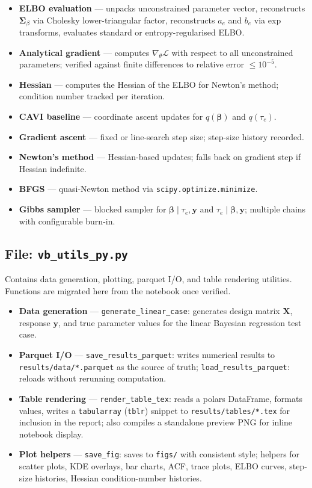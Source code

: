 \documentclass[11pt,a4paper]{article}
\begin{document}
\begin{itemize}
  \item \textbf{ELBO evaluation} — unpacks unconstrained parameter vector, reconstructs $\bm{\Sigma}_\beta$ via Cholesky lower-triangular factor, reconstructs $a_e$ and $b_e$ via exp transforms, evaluates standard or entropy-regularised ELBO.
  \item \textbf{Analytical gradient} — computes $\nabla_\theta \mathcal{L}$ with respect to all unconstrained parameters; verified against finite differences to relative error $\leq 10^{-5}$.
  \item \textbf{Hessian} — computes the Hessian of the ELBO for Newton's method; condition number tracked per iteration.
  \item \textbf{CAVI baseline} — coordinate ascent updates for $q(\bm{\beta})$ and $q(\tau_e)$.
  \item \textbf{Gradient ascent} — fixed or line-search step size; step-size history recorded.
  \item \textbf{Newton's method} — Hessian-based updates; falls back on gradient step if Hessian indefinite.
  \item \textbf{BFGS} — quasi-Newton method via \texttt{scipy.optimize.minimize}.
  \item \textbf{Gibbs sampler} — blocked sampler for $\bm{\beta} \mid \tau_e, \bm{y}$ and $\tau_e \mid \bm{\beta}, \bm{y}$; multiple chains with configurable burn-in.
\end{itemize}

\subsection*{File: \texttt{vb\_utils\_py.py}}

Contains data generation, plotting, parquet I/O, and table rendering utilities. Functions are migrated here from the notebook once verified.

\begin{itemize}
  \item \textbf{Data generation} — \texttt{generate\_linear\_case}: generates design matrix $\bm{X}$, response $\bm{y}$, and true parameter values for the linear Bayesian regression test case.
  \item \textbf{Parquet I/O} — \texttt{save\_results\_parquet}: writes numerical results to \texttt{results/data/*.parquet} as the source of truth; \texttt{load\_results\_parquet}: reloads without rerunning computation.
  \item \textbf{Table rendering} — \texttt{render\_table\_tex}: reads a polars DataFrame, formats values, writes a \texttt{tabularray} (\texttt{tblr}) snippet to \texttt{results/tables/*.tex} for \verb|| inclusion in the report; also compiles a standalone preview PNG for inline notebook display.
  \item \textbf{Plot helpers} — \texttt{save\_fig}: saves to \texttt{figs/} with consistent style; helpers for scatter plots, KDE overlays, bar charts, ACF, trace plots, ELBO curves, step-size histories, Hessian condition-number histories.
\end{itemize}
\end{document}
